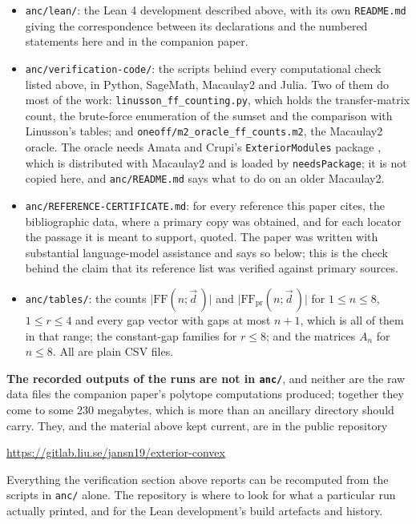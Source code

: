 \documentclass[11pt, a4paper, abstract=yes]{scrartcl}
\theoremstyle{definition}
\theoremstyle{remark}
\theoremstyle{plain}
\let\autocite\cite
\begin{document}
\begin{itemize}
\item \texttt{anc/lean/}: the Lean 4 development described above, with its own \texttt{README.md} giving the
correspondence between its declarations and the numbered statements here and in the companion
paper.
\item \texttt{anc/verification-code/}: the scripts behind every computational check listed above, in Python,
SageMath, Macaulay2 and Julia. Two of them do most of the work: \texttt{linusson\_ff\_counting.py},
which holds the transfer-matrix count, the brute-force enumeration of the sumset and the
comparison with Linusson's tables; and \texttt{oneoff/m2\_oracle\_ff\_counts.m2}, the Macaulay2 oracle.
The oracle needs Amata and Crupi's \texttt{ExteriorModules} package \autocite{AmataCrupi2021}, which is
distributed with Macaulay2 and is loaded by \texttt{needsPackage}; it is not copied here, and
\texttt{anc/README.md} says what to do on an older Macaulay2.
\item \texttt{anc/REFERENCE-CERTIFICATE.md}: for every reference this paper cites, the bibliographic data,
where a primary copy was obtained, and for each locator the passage it is meant to support,
quoted. The paper was written with substantial language-model assistance and says so below;
this is the check behind the claim that its reference list was verified against primary sources.
\item \texttt{anc/tables/}: the counts \(\lvert\mathrm{FF}(n;\vec d\,)\rvert\) and
\(\lvert\mathrm{FF}_{\mathrm{pr}}(n;\vec d\,)\rvert\) for \(1\le n\le 8\), \(1\le r\le 4\) and every
gap vector with gaps at most \(n+1\), which is all of them in that range; the constant-gap
families for \(r\le 8\); and the matrices \(A_n\) for \(n\le 8\). All are plain CSV files.
\end{itemize}

\textbf{\textbf{The recorded outputs of the runs are not in \texttt{anc/}}}, and neither are the raw data files the
companion paper's polytope computations produced; together they come to some 230 megabytes, which
is more than an ancillary directory should carry. They, and the material above kept current, are
in the public repository

\begin{center}
\url{https://gitlab.liu.se/jansn19/exterior-convex}
\end{center}

Everything the verification section above reports can be recomputed from the scripts in \texttt{anc/}
alone. The repository is where to look for what a particular run actually printed, and for the
Lean development's build artefacts and history.
\end{document}
